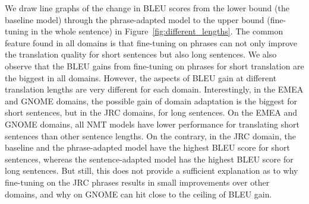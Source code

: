 We draw line graphs of the change in BLEU scores from the lower bound (the baseline model) through the phrase-adapted model to the upper bound (fine-tuning in the whole sentence) in Figure~\ref{fig:different_lengths}. %
The common feature found in all domains is that fine-tuning on phrases can not only improve the translation quality for short sentences but also long sentences. We also observe that the BLEU gains from fine-tuning on phrases for short translation are the biggest in all domains. 
However, the aspects of BLEU gain at different translation lengths are very different for each domain. Interestingly, in the EMEA and GNOME domains, the possible gain of domain adaptation is the biggest for short sentences, but in the JRC domains, for long sentences. 
On the EMEA and GNOME domains, all NMT models have lower performance for translating short sentences than other sentence lengths. On the contrary, in the JRC domain, the baseline and the phrase-adapted model have the highest BLEU score for short sentences, whereas the sentence-adapted model has the highest BLEU score for long sentences.
But still, this does not provide a sufficient explanation as to why fine-tuning on the JRC phrases results in small improvements over other domains, and why on GNOME can hit close to the ceiling of BLEU gain.

